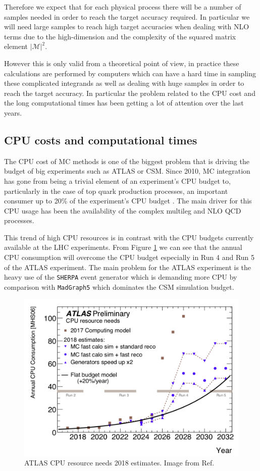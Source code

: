 \documentclass[../main/main.tex]{subfiles}
\begin{document}
Therefore we expect that for each physical process there will be a number of samples needed in order to reach the target accuracy required. 
In particular we will need large samples to reach high target accuracies when dealing with NLO terms due to the high-dimension and the 
complexity of the squared matrix element $|\mathcal{M}|^2$.

However this is only valid from a theoretical point of view, in practice these calculations are performed by computers which can have a hard time
in sampling these complicated integrands as well as dealing with huge samples in order to reach the target accuracy.
In particular the problem related to the CPU cost and the long computational times has been getting a lot of attention over the last years.



\subsection{CPU costs and computational times}
\label{cost}
The CPU cost of MC methods is one of the biggest problem that is driving the budget of big experiments such as ATLAS or CSM.
Since 2010, MC integration has gone from being a trivial element of an experiment's CPU budget to, particularly in the case of top 
quark production processes, an important consumer up to 20\% of the experiment's CPU budget \cite{Buckley:2019wov}. 
The main driver for this CPU usage has been the availability of the complex multileg and NLO QCD processes. 

This trend of high CPU resources  is in contrast with the CPU budgets currently available at the LHC experiments.   
From Figure \ref{CPU cost} we can see that the annual CPU consumption will overcome the CPU budget especially in Run 4 and Run 5 of the ATLAS
experiment. 
The main problem for the ATLAS experiment is the heavy use of the \texttt{SHERPA} event generator which is demanding more CPU  by comparison with
\texttt{MadGraph5} which dominates the CSM simulation budget. 

\begin{figure}[h]
	\centering
	\includegraphics[width = 12cm]{../images/CPU-cost.png}
	\caption{ATLAS CPU resource needs 2018 estimates. Image from Ref\cite{ATL-SOFT-PUB-2021-001}.}
	\label{CPU cost}
\end{figure}
\end{document}
